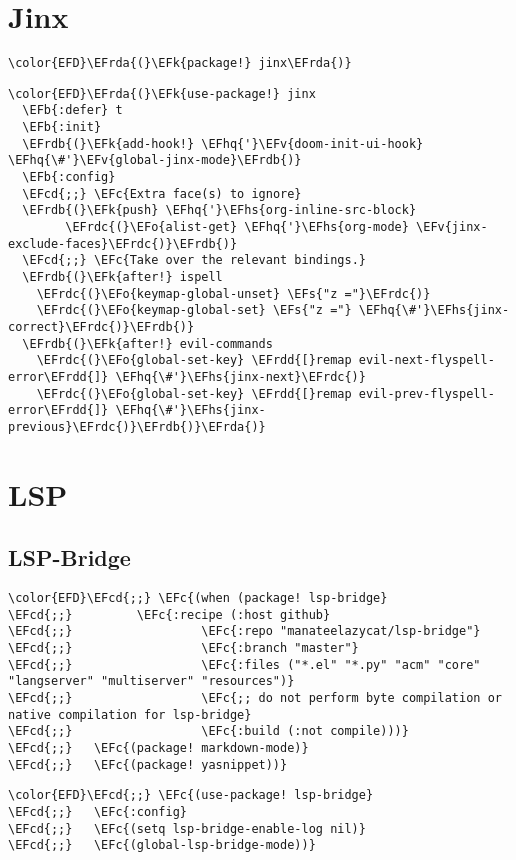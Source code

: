 \documentclass[12pt]{article}
\theoremstyle{plain}%
\theoremstyle{definition}
\theoremstyle{remark}
\newcommand{\EFc}[1]{\textcolor{EFc}{#1}} %
\newcommand{\EFcd}[1]{\textcolor{EFcd}{#1}} %
\newcommand{\EFs}[1]{\textcolor{EFs}{#1}} %
\newcommand{\EFk}[1]{\textcolor{EFk}{#1}} %
\newcommand{\EFb}[1]{\textcolor{EFb}{#1}} %
\newcommand{\EFv}[1]{\textcolor{EFv}{#1}} %
\newcommand{\EFo}[1]{\textcolor{EFo}{#1}} %
\newcommand{\EFhq}[1]{\textcolor{EFhq}{#1}} %
\newcommand{\EFhs}[1]{\textcolor{EFhs}{#1}} %
\newcommand{\EFrda}[1]{\textcolor{EFrda}{#1}} %
\newcommand{\EFrdb}[1]{\textcolor{EFrdb}{#1}} %
\newcommand{\EFrdc}[1]{\textcolor{EFrdc}{#1}} %
\newcommand{\EFrdd}[1]{\textcolor{EFrdd}{#1}} %
\begin{document}
\section{Jinx}
\label{sec:orgb88d3d2}
\begin{Code}
\begin{Verbatim}
\color{EFD}\EFrda{(}\EFk{package!} jinx\EFrda{)}
\end{Verbatim}
\end{Code}
\begin{Code}
\begin{Verbatim}
\color{EFD}\EFrda{(}\EFk{use-package!} jinx
  \EFb{:defer} t
  \EFb{:init}
  \EFrdb{(}\EFk{add-hook!} \EFhq{'}\EFv{doom-init-ui-hook} \EFhq{\#'}\EFv{global-jinx-mode}\EFrdb{)}
  \EFb{:config}
  \EFcd{;;} \EFc{Extra face(s) to ignore}
  \EFrdb{(}\EFk{push} \EFhq{'}\EFhs{org-inline-src-block}
        \EFrdc{(}\EFo{alist-get} \EFhq{'}\EFhs{org-mode} \EFv{jinx-exclude-faces}\EFrdc{)}\EFrdb{)}
  \EFcd{;;} \EFc{Take over the relevant bindings.}
  \EFrdb{(}\EFk{after!} ispell
    \EFrdc{(}\EFo{keymap-global-unset} \EFs{"z ="}\EFrdc{)}
    \EFrdc{(}\EFo{keymap-global-set} \EFs{"z ="} \EFhq{\#'}\EFhs{jinx-correct}\EFrdc{)}\EFrdb{)}
  \EFrdb{(}\EFk{after!} evil-commands
    \EFrdc{(}\EFo{global-set-key} \EFrdd{[}remap evil-next-flyspell-error\EFrdd{]} \EFhq{\#'}\EFhs{jinx-next}\EFrdc{)}
    \EFrdc{(}\EFo{global-set-key} \EFrdd{[}remap evil-prev-flyspell-error\EFrdd{]} \EFhq{\#'}\EFhs{jinx-previous}\EFrdc{)}\EFrdb{)}\EFrda{)}
\end{Verbatim}
\end{Code}
\section{LSP}
\label{sec:orge878071}
\subsection{LSP-Bridge}
\label{sec:org6316a4b}
\begin{Code}
\begin{Verbatim}
\color{EFD}\EFcd{;;} \EFc{(when (package! lsp-bridge}
\EFcd{;;}         \EFc{:recipe (:host github}
\EFcd{;;}                  \EFc{:repo "manateelazycat/lsp-bridge"}
\EFcd{;;}                  \EFc{:branch "master"}
\EFcd{;;}                  \EFc{:files ("*.el" "*.py" "acm" "core" "langserver" "multiserver" "resources")}
\EFcd{;;}                  \EFc{;; do not perform byte compilation or native compilation for lsp-bridge}
\EFcd{;;}                  \EFc{:build (:not compile)))}
\EFcd{;;}   \EFc{(package! markdown-mode)}
\EFcd{;;}   \EFc{(package! yasnippet))}
\end{Verbatim}
\end{Code}
\begin{Code}
\begin{Verbatim}
\color{EFD}\EFcd{;;} \EFc{(use-package! lsp-bridge}
\EFcd{;;}   \EFc{:config}
\EFcd{;;}   \EFc{(setq lsp-bridge-enable-log nil)}
\EFcd{;;}   \EFc{(global-lsp-bridge-mode))}
\end{Verbatim}
\end{Code}
\end{document}

